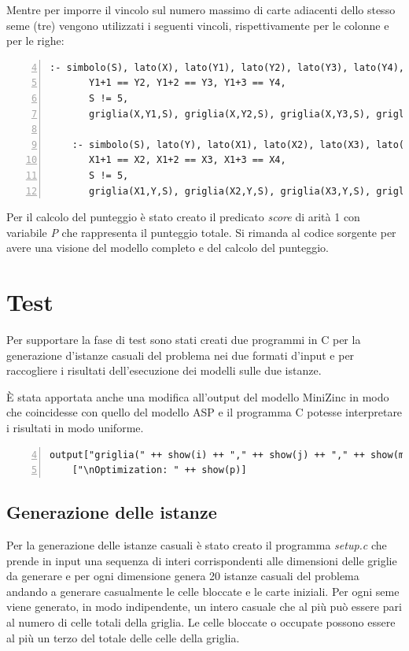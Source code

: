 \documentclass[12pt]{article}
\begin{document}
    Mentre per imporre il vincolo sul numero massimo di carte adiacenti dello stesso seme (tre) vengono utilizzati i seguenti vincoli, rispettivamente per le colonne e per le righe:
    \begin{Verbatim}[numbers=left,firstnumber=4,frame=lines,framesep=3mm,label={verb:asp\_four\_different},breaklines=true]
    :- simbolo(S), lato(X), lato(Y1), lato(Y2), lato(Y3), lato(Y4),
       Y1+1 == Y2, Y1+2 == Y3, Y1+3 == Y4,
       S != 5,
       griglia(X,Y1,S), griglia(X,Y2,S), griglia(X,Y3,S), griglia(X,Y4,S).

    :- simbolo(S), lato(Y), lato(X1), lato(X2), lato(X3), lato(X4),
       X1+1 == X2, X1+2 == X3, X1+3 == X4,
       S != 5,
       griglia(X1,Y,S), griglia(X2,Y,S), griglia(X3,Y,S), griglia(X4,Y,S).
    \end{Verbatim}

    Per il calcolo del punteggio è stato creato il predicato \textit{score} di arità 1 con variabile \textit{P} che rappresenta il punteggio totale.
    Si rimanda al codice sorgente per avere una visione del modello completo e del calcolo del punteggio.

    \section{Test}\label{sec:test}
    Per supportare la fase di test sono stati creati due programmi in C per la generazione d'istanze casuali del problema nei due formati d'input e per raccogliere i risultati dell'esecuzione dei modelli sulle due istanze.

    È stata apportata anche una modifica all'output del modello MiniZinc in modo che coincidesse con quello del modello ASP e il programma C potesse interpretare i risultati in modo uniforme.
    \begin{Verbatim}[numbers=left,firstnumber=4,frame=lines,framesep=3mm,label={verb:output\_mzn},breaklines=true]
    output["griglia(" ++ show(i) ++ "," ++ show(j) ++ "," ++ show(m[i,j]) ++ ") " | i,j in 1..n] ++
    ["\nOptimization: " ++ show(p)]
    \end{Verbatim}

    \subsection{Generazione delle istanze}\label{subsec:generazione-delle-istanze}
    Per la generazione delle istanze casuali è stato creato il programma \textit{setup.c} che prende in input una sequenza di interi corrispondenti alle dimensioni delle griglie da generare e per ogni dimensione genera 20 istanze casuali del problema andando a generare casualmente le celle bloccate e le carte iniziali.
    Per ogni seme viene generato, in modo indipendente, un intero casuale che al più può essere pari al numero di celle totali della griglia.
    Le celle bloccate o occupate possono essere al più un terzo del totale delle celle della griglia.
\end{document}
